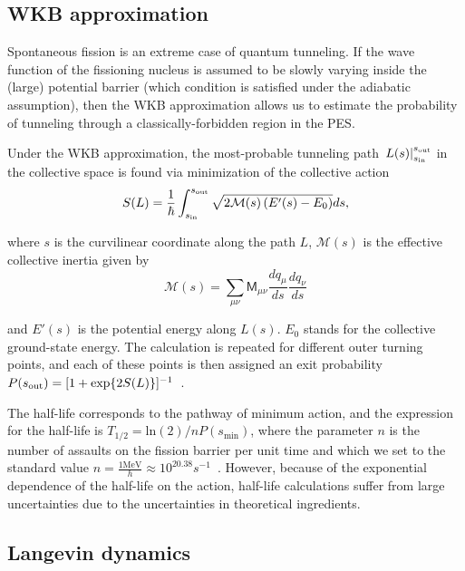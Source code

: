 \subsection{WKB approximation}\label{sect:wkb}
Spontaneous fission is an extreme case of quantum tunneling. If the wave function of the fissioning nucleus is assumed to be slowly varying inside the (large) potential barrier (which condition is satisfied under the adiabatic assumption), then the WKB approximation allows us to estimate the probability of tunneling through a classically-forbidden region in the PES.

Under the WKB approximation, the most-probable tunneling path $\left. L(s) \right|_{s_{\rm in}}^{s_{\rm out}}$ in the collective space is found via minimization of the collective action
\begin{equation}\label{eq:action} 
S(L) = \frac{1}{\hbar}\int_{s_{\rm in}}^{s_{\rm out}} \sqrt{2\mathcal{M}(s)\left(E'(s)-E_0\right)}ds,
\end{equation} 

\noindent where $s$ is the curvilinear coordinate along the path $L$, $\mathcal{M}(s)$ is the effective collective inertia given by~\cite{Sadhukhan2013}
\begin{equation}
\mathcal{M}(s) = \sum_{\mu\nu} \mathsf{M}_{\mu\nu} \frac{dq_\mu}{ds} \frac{dq_\nu}{ds}
\end{equation}

\noindent and $E'(s)$ is the potential energy along $L(s)$. $E_0$ stands for the collective ground-state energy. The calculation is repeated for different outer turning points, and each of these points is then assigned an exit probability $P(s_{\rm out})=[1+\exp{2S(L)}]^{-1}$~\cite{Baran1978}. 

The half-life corresponds to the pathway of minimum action, and the expression for the half-life is $T_{1/2} = \mathrm{ln}(2)/nP(s_\mathrm{min})$, where the parameter $n$ is the number of assaults on the fission barrier per unit time and which we set to the standard value $n=\frac{1 \mathrm{MeV}}{h}\approx10^{20.38} s^{-1}$~\cite{Baran1978}. However, because of the exponential dependence of the half-life on the action, half-life calculations suffer from large uncertainties due to the uncertainties in theoretical ingredients.

\subsection{Langevin dynamics}

